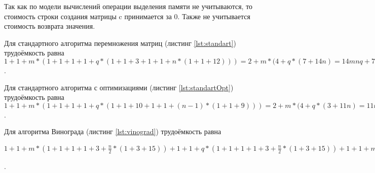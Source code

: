 Так как по модели вычислений операции выделения памяти не учитываются, то стоимость строки создания матрицы c принимается за 0. Также не учитывается стоимость возврата значения.

Для стандартного алгоритма перемножения матриц (листинг \ref{lst:standart}) трудоёмкость равна $1 + 1 + m * (1 + 1 + 1 + 1 + q * (1 + 1 + 3 + 1 + 1 + n * (1 + 1 + 12))) = 2 + m * (4 + q * (7 + 14n) = 14mnq + 7mq + 4m + 2$.

Для стандартного алгоритма с оптимизациями (листинг \ref{lst:standartOpt}) трудоёмкость равна $1 + 1 + m * (1 + 1 + 1 + 1 + q * (1 + 1 + 10 + 1 + 1 + (n - 1) * (1 + 1 + 9))) = 2 + m * (4 + q * (3 + 11n) = 11mnq + 3mq + 4m + 2$.

Для алгоритма Винограда (листинг \ref{lst:vinograd}) трудоёмкость равна $1 + 1 + m * (1 + 1 + 1 + 1 + 3 + \frac{n}{2} * (1 + 3 + 15)) + 1 + 1 + q * (1 + 1 + 1 + 1 + 3 + \frac{n}{2} * (1 + 3 + 15)) + 1 + 1 + m * (1 + 1 + 1 + 1 + q * (1 + 1 + 6 + 1 + 3 + \frac{n}{2} * (1 + 3 + 28) + 3 + 
	\begin{cases}
		0 & \text{, n четное, лучший случай (л. с.)}\\
		14 & \text{, n нечетное, худший случай (х. с.)} \\
	\end{cases}
	)) = 2 + 7m + \frac{19n}{2} + 2 + 7q + \frac{19n}{2} + 2 + m * (4 + q * (12 + 16n + 
	\begin{cases}
		0 & \text{, л. с.}\\
		14 & \text{, х. с.} \\
	\end{cases}
	)) = 16mnq + 
	\begin{cases}
		12 & \text{, л. с.}\\
		26 & \text{, х. с.} \\
	\end{cases} mq + \frac{19nq}{2} + \frac{19mn}{2} + 11m + 7q + 6$.

